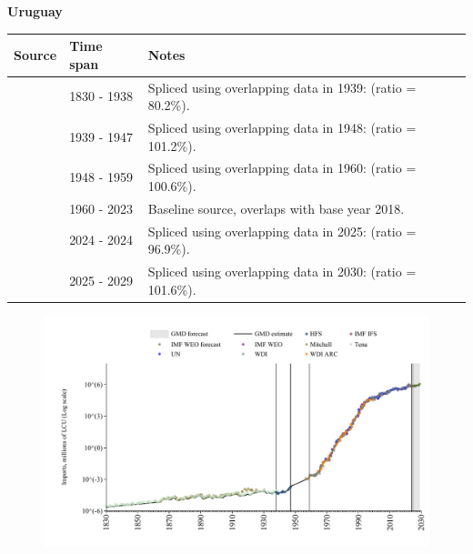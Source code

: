 \documentclass[12pt,a4paper,landscape]{article}
\begin{document}
\begin{adjustbox}{max totalsize={\paperwidth}{\paperheight},center}
\begin{minipage}[t][\textheight][t]{\textwidth}
\vspace*{0.5cm}
{}
\begin{center}
{\Large\bfseries Uruguay}
\end{center}
\vspace{0.5cm}
\begin{table}[H]
\centering
\small
\begin{tabular}{|l|l|l|}
\hline
\textbf{Source} & \textbf{Time span} & \textbf{Notes} \\
\hline
\rowcolor{white}\cite{Tena}& 1830 - 1938 &Spliced using overlapping data in 1939: (ratio = 80.2\%).\\
\rowcolor{lightgray}\cite{HFS}& 1939 - 1947 &Spliced using overlapping data in 1948: (ratio = 101.2\%).\\
\rowcolor{white}\cite{Mitchell}& 1948 - 1959 &Spliced using overlapping data in 1960: (ratio = 100.6\%).\\
\rowcolor{lightgray}\cite{WDI}& 1960 - 2023 &Baseline source, overlaps with base year 2018.\\
\rowcolor{white}\cite{IMF_IFS}& 2024 - 2024 &Spliced using overlapping data in 2025: (ratio = 96.9\%).\\
\rowcolor{lightgray}\cite{IMF_WEO_forecast}& 2025 - 2029 &Spliced using overlapping data in 2030: (ratio = 101.6\%).\\
\hline
\end{tabular}
\end{table}
\begin{figure}[H]
\centering
\includegraphics[width=\textwidth,height=0.6\textheight,keepaspectratio]{graphs/URY_imports.pdf}
\end{figure}
\end{minipage}
\end{adjustbox}
\end{document}
